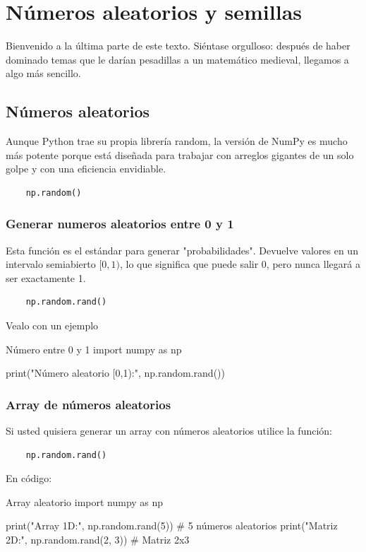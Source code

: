 \section{Números aleatorios y semillas}

Bienvenido a la última parte de este texto. Siéntase orgulloso: después de haber dominado temas que le darían pesadillas a un matemático medieval, llegamos a algo más sencillo.

\subsection{Números aleatorios}

Aunque Python trae su propia librería random, la versión de NumPy es mucho más potente porque está diseñada para trabajar con arreglos gigantes de un solo golpe y con una eficiencia envidiable.
\begin{verbatim}
    np.random()
\end{verbatim}


\subsubsection{Generar numeros aleatorios entre 0 y 1}

Esta función es el estándar para generar "probabilidades". Devuelve valores en un intervalo semiabierto \([0,1)\), lo que significa que puede salir 0, pero nunca llegará a ser exactamente 1.
\begin{verbatim}
    np.random.rand()
\end{verbatim}

Vealo con un ejemplo
\begin{pycode}{Número entre 0 y 1}
    import numpy as np

    print("Número aleatorio [0,1):", np.random.rand())
\end{pycode}

\subsubsection{Array de números aleatorios}

Si usted quisiera generar un array con números aleatorios utilice la función:
\begin{verbatim}
    np.random.rand()
\end{verbatim}

En código:
\begin{pycode}{Array aleatorio}
    import numpy as np

    print("Array 1D:", np.random.rand(5)) # 5 números aleatorios
    print("Matriz 2D:\n", np.random.rand(2, 3)) # Matriz 2x3
\end{pycode}

